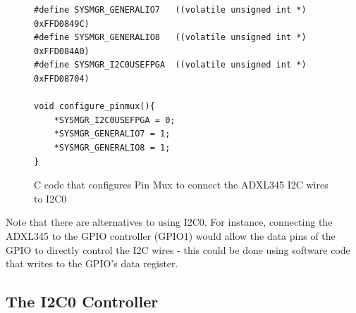\documentclass[11pt, twoside, pdftex]{article}
\begin{document}


\lstset{language=C,numbers=left}
\begin{figure}[H]
\begin{center}
\begin{minipage}[t]{16 cm}
\begin{lstlisting}
#define SYSMGR_GENERALIO7   ((volatile unsigned int *) 0xFFD0849C)
#define SYSMGR_GENERALIO8   ((volatile unsigned int *) 0xFFD084A0)
#define SYSMGR_I2C0USEFPGA  ((volatile unsigned int *) 0xFFD08704)

void configure_pinmux(){
    *SYSMGR_I2C0USEFPGA = 0;
    *SYSMGR_GENERALIO7 = 1;
    *SYSMGR_GENERALIO8 = 1;
}
\end{lstlisting}
\end{minipage}
\end{center}
\vspace{-0.33in}\caption{C code that configures Pin Mux to connect the ADXL345 I2C wires to I2C0}
\label{fig:pin_muxing_code}
\end{figure}

Note that there are alternatives to using I2C0. For instance, connecting the ADXL345 to the GPIO controller (GPIO1) would allow the data pins of the GPIO to directly control the I2C wires - this could be done using software code that writes to the GPIO's data register. %

\subsection{The I2C0 Controller}
\label{sec:i2c_controller}
\end{document}
